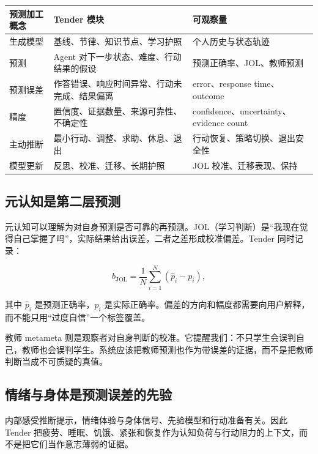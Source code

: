 \documentclass[UTF8,a4paper,11pt]{ctexart}
\begin{document}
\begin{center}
\begin{longtable}{@{}p{3.2cm}p{4.6cm}p{6.2cm}@{}}
\toprule
\textbf{预测加工概念} & \textbf{Tender 模块} & \textbf{可观察量} \\
\midrule
生成模型 & 基线、节律、知识节点、学习护照 & 个人历史与状态轨迹 \\
预测 & Agent 对下一步状态、难度、行动结果的假设 & 预测正确率、JOL、教师预测 \\
预测误差 & 作答错误、响应时间异常、行动未完成、结果偏离 & error、response time、outcome \\
精度 & 置信度、证据数量、来源可靠性、不确定性 & confidence、uncertainty、evidence count \\
主动推断 & 最小行动、调整、求助、休息、退出 & 行动恢复、策略切换、退出安全性 \\
模型更新 & 反思、校准、迁移、长期护照 & JOL 校准、迁移表现、保持 \\
\bottomrule
\end{longtable}
\end{center}

\subsection{元认知是第二层预测}

元认知可以理解为对自身预测是否可靠的再预测。JOL（学习判断）是“我现在觉得自己掌握了吗”，实际结果给出误差，二者之差形成校准偏差。Tender 同时记录：

\begin{equation}
b_{\mathrm{JOL}}=\frac{1}{N}\sum_{i=1}^{N}(\hat p_i-p_i),
\end{equation}

其中 \(\hat p_i\) 是预测正确率，\(p_i\) 是实际正确率。偏差的方向和幅度都需要向用户解释，而不能只用“过度自信”一个标签覆盖。

教师 metameta 则是观察者对自身判断的校准。它提醒我们：不只学生会误判自己，教师也会误判学生。系统应该把教师预测也作为带误差的证据，而不是把教师判断当成不可质疑的真值。

\subsection{情绪与身体是预测误差的先验}

内部感受推断提示，情绪体验与身体信号、先验模型和行动准备有关\cite{Seth2013}。因此 Tender 把疲劳、睡眠、饥饿、紧张和恢复作为认知负荷与行动阻力的上下文，而不是把它们当作意志薄弱的证据。
\end{document}
